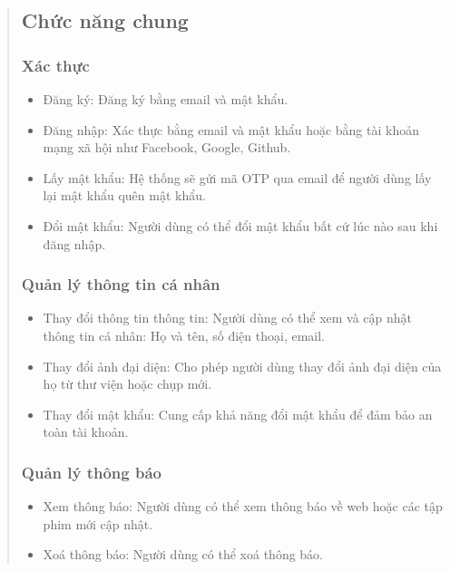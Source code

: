 \begin{quote}
\subsection{Chức năng chung} 
\subsubsection{Xác thực}
\begin{itemize}
    \item Đăng ký: Đăng ký bằng email và mật khẩu.
    \item Đăng nhập: Xác thực bằng email và mật khẩu hoặc bằng tài khoản mạng xã hội như Facebook, Google, Github.
    \item Lấy mật khẩu: Hệ thống sẽ gửi mã OTP qua email để người dùng lấy lại mật khẩu quên mật khẩu.
    \item Đổi mật khẩu: Người dùng có thể đổi mật khẩu bất cứ lúc nào sau khi đăng nhập.
\end{itemize}

\subsubsection{Quản lý thông tin cá nhân}
\begin{itemize}
    \item Thay đổi thông tin thông tin: Người dùng có thể xem và cập nhật thông tin cá nhân: Họ và tên, số điện thoại, email.
    \item Thay đổi ảnh đại diện: Cho phép người dùng thay đổi ảnh đại diện của họ từ thư viện hoặc chụp mới.
    \item Thay đổi mật khẩu: Cung cấp khả năng đổi mật khẩu để đảm bảo an toàn tài khoản.
\end{itemize}

\subsubsection{Quản lý thông báo}
\begin{itemize}
    \item Xem thông báo: Người dùng có thể xem thông báo về web hoặc các tập phim mới cập nhật.
    \item Xoá thông báo: Người dùng có thể xoá thông báo.
\end{itemize}


\end{quote}
